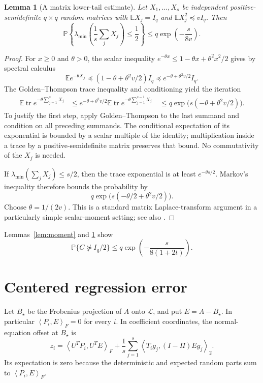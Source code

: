 \documentclass[11pt]{article}
\newtheorem{lemma}[theorem]{Lemma}
\theoremstyle{definition}
\newcommand{\E}{\mathbb E}
\newcommand{\Prob}{\mathbb P}
\newcommand{\tr}{\operatorname{tr}}
\newcommand{\ip}[2]{\left\langle#1,#2\right\rangle}
\begin{document}
\begin{lemma}[A matrix lower-tail estimate]\label{lem:tail}
Let $X_1,\ldots,X_s$ be independent positive-semidefinite $q\times q$ random matrices with $\E X_j=I_q$ and $\E X_j^2\preceq vI_q$. Then
\[
 \Prob\left\{\lambda_{\min}\left(\frac1s\sum_jX_j\right)\le\frac12\right\}
 \le q\exp\left(-\frac{s}{8v}\right).
\]
\end{lemma}
\begin{proof}
For $x\ge0$ and $\theta>0$, the scalar inequality
$e^{-\theta x}\le1-\theta x+\theta^2x^2/2$ gives by spectral calculus
\[
 \E e^{-\theta X_j}
 \preceq(1-\theta+\theta^2v/2)I_q
 \preceq e^{-\theta+\theta^2v/2}I_q.
\]
The Golden--Thompson trace inequality \cite{Golden1965} and conditioning yield the iteration
\begin{align*}
 \E\tr e^{-\theta\sum_{j=1}^sX_j}
 &\le e^{-\theta+\theta^2v/2}
       \E\tr e^{-\theta\sum_{j=1}^{s-1}X_j}\
 &\le q\exp\bigl(s(-\theta+\theta^2v/2)\bigr).
\end{align*}
To justify the first step, apply Golden--Thompson to the last summand and condition on all preceding summands. The conditional expectation of its exponential is bounded by a scalar multiple of the identity; multiplication inside a trace by a positive-semidefinite matrix preserves that bound. No commutativity of the $X_j$ is needed.

If $\lambda_{\min}(\sum_jX_j)\le s/2$, then the trace exponential is at least $e^{-\theta s/2}$. Markov's inequality therefore bounds the probability by
\[
 q\exp\bigl(s(-\theta/2+\theta^2v/2)\bigr).
\]
Choose $\theta=1/(2v)$. This is a standard matrix Laplace-transform argument in a particularly simple scalar-moment setting; see also \cite{Tropp2012}.
\end{proof}

Lemmas~\ref{lem:moment} and \ref{lem:tail} show
\begin{equation}\label{eq:gramgood}
 \Prob\{C\nsucceq I_q/2\}
 \le q\exp\left(-\frac{s}{8(1+2t)}\right).
\end{equation}

\section{Centered regression error}
Let $B_\star$ be the Frobenius projection of $A$ onto $\mathcal L$, and put $E=A-B_\star$. In particular $\ip{P_i}{E}_F=0$ for every $i$. In coefficient coordinates, the normal-equation offset at $B_\star$ is
\[
 z_i=\ip{U^TP_i}{U^TE}_F
       +\frac1s\sum_{j=1}^s\ip{T_i g_j}{(I-\Pi)E g_j}_2.
\]
Its expectation is zero because the deterministic and expected random parts sum to $\ip{P_i}{E}_F$.
\end{document}
